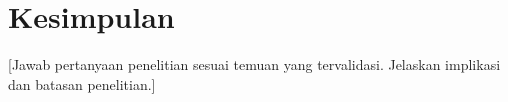 \chapter{Kesimpulan}
[Jawab pertanyaan penelitian sesuai temuan yang tervalidasi. Jelaskan implikasi dan batasan penelitian.]
